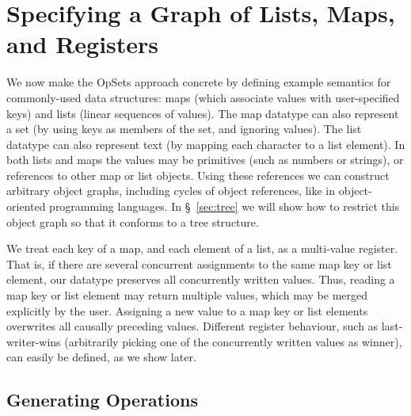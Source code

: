 \section{Specifying a Graph of Lists, Maps, and Registers}\label{sec:datatypes}

We now make the OpSets approach concrete by defining example semantics for commonly-used data structures: maps (which associate values with user-specified keys) and lists (linear sequences of values).
The map datatype can also represent a set (by using keys as members of the set, and ignoring values).
The list datatype can also represent text (by mapping each character to a list element).
In both lists and maps the values may be primitives (such as numbers or strings), or references to other map or list objects.
Using these references we can construct arbitrary object graphs, including cycles of object references, like in object-oriented programming languages.
In \S~\ref{sec:tree} we will show how to restrict this object graph so that it conforms to a tree structure.

We treat each key of a map, and each element of a list, as a multi-value register.
That is, if there are several concurrent assignments to the same map key or list element, our datatype preserves all concurrently written values.
Thus, reading a map key or list element may return multiple values, which may be merged explicitly by the user.
Assigning a new value to a map key or list elements overwrites all causally preceding values.
Different register behaviour, such as last-writer-wins (arbitrarily picking one of the concurrently written values as winner), can easily be defined, as we show later.

\subsection{Generating Operations}\label{sec:datatypes-gen}

